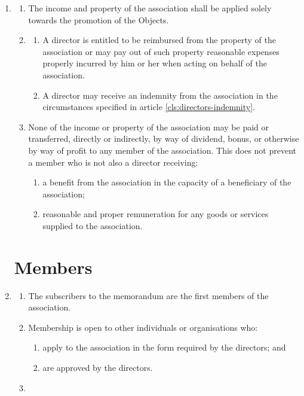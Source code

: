 \begin{enumerate}
\item
  \label{cls:income-property}
  \begin{enumerate}
  \item
    The income and property of the association shall be applied solely
    towards the promotion of the Objects.
  \item
    \label{scls:director-reimburse}
    \begin{enumerate}
    \item
      A director is entitled to be reimbursed from the property of the
      association or may pay out of such property reasonable expenses
      properly incurred by him or her when acting on behalf of the
      association.
    \item
      A director may receive an indemnity from the association in the
      circumstances specified in article \ref{cls:directors-indemnity}.
    \end{enumerate}
  \item
    None of the income or property of the association may be paid or transferred,
    directly or indirectly, by way of dividend, bonus, or otherwise by way of
    profit to any member of the association. This does not prevent a member who
    is not also a director receiving:
    \begin{enumerate}
    \item
      a benefit from the association in the capacity of a beneficiary of the
      association;
    \item
      reasonable and proper remuneration for any goods or services
      supplied to the association.
    \end{enumerate}
  \end{enumerate}

\section{Members}

\item
  \label{cls:subscribers}
  \begin{enumerate}
  \item
    The subscribers to the memorandum are the first members of the association.
  \item
    Membership is open to other individuals or organisations who:
    \begin{enumerate}
    \item
      apply to the association in the form required by the directors; and
    \item
      are approved by the directors.
    \end{enumerate}
  \item


\end{enumerate}
\end{enumerate}
